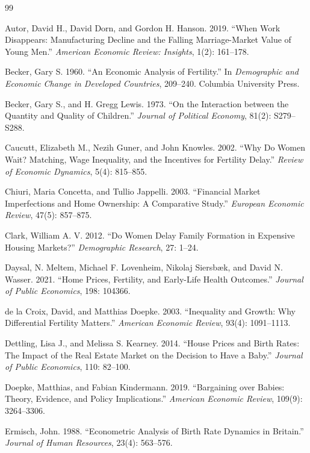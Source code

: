 \documentclass[11pt]{article}
\begin{document}
\begin{thebibliography}{99}

 Autor, David H., David Dorn, and Gordon H. Hanson. 2019. ``When Work Disappears: Manufacturing Decline and the Falling Marriage-Market Value of Young Men.'' \textit{American Economic Review: Insights}, 1(2): 161--178.

 Becker, Gary S. 1960. ``An Economic Analysis of Fertility.'' In \textit{Demographic and Economic Change in Developed Countries}, 209--240. Columbia University Press.

 Becker, Gary S., and H. Gregg Lewis. 1973. ``On the Interaction between the Quantity and Quality of Children.'' \textit{Journal of Political Economy}, 81(2): S279--S288.

 Caucutt, Elizabeth M., Nezih Guner, and John Knowles. 2002. ``Why Do Women Wait? Matching, Wage Inequality, and the Incentives for Fertility Delay.'' \textit{Review of Economic Dynamics}, 5(4): 815--855.

 Chiuri, Maria Concetta, and Tullio Jappelli. 2003. ``Financial Market Imperfections and Home Ownership: A Comparative Study.'' \textit{European Economic Review}, 47(5): 857--875.

 Clark, William A. V. 2012. ``Do Women Delay Family Formation in Expensive Housing Markets?'' \textit{Demographic Research}, 27: 1--24.

 Daysal, N. Meltem, Michael F. Lovenheim, Nikolaj Siersbæk, and David N. Wasser. 2021. ``Home Prices, Fertility, and Early-Life Health Outcomes.'' \textit{Journal of Public Economics}, 198: 104366.

 de la Croix, David, and Matthias Doepke. 2003. ``Inequality and Growth: Why Differential Fertility Matters.'' \textit{American Economic Review}, 93(4): 1091--1113.

 Dettling, Lisa J., and Melissa S. Kearney. 2014. ``House Prices and Birth Rates: The Impact of the Real Estate Market on the Decision to Have a Baby.'' \textit{Journal of Public Economics}, 110: 82--100.

 Doepke, Matthias, and Fabian Kindermann. 2019. ``Bargaining over Babies: Theory, Evidence, and Policy Implications.'' \textit{American Economic Review}, 109(9): 3264--3306.

 Ermisch, John. 1988. ``Econometric Analysis of Birth Rate Dynamics in Britain.'' \textit{Journal of Human Resources}, 23(4): 563--576.


\end{thebibliography}
\end{document}
